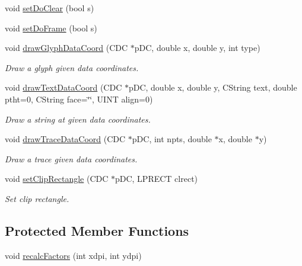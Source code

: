 \begin{DoxyCompactItemize}
\item 
void \hyperlink{classCRPGraphHelper_a94b209990d47ec4314dd090c103d38be}{setDoClear} (bool s)
\item 
void \hyperlink{classCRPGraphHelper_aeb54e6db77199139ccf11a38ad2a1aba}{setDoFrame} (bool s)
\item 
void \hyperlink{classCRPGraphHelper_ab2d2ca19b1e03fc94fb0dc6f3365f8ed}{drawGlyphDataCoord} (CDC $\ast$pDC, double x, double y, int type)
\begin{DoxyCompactList}\small\item\em Draw a glyph given data coordinates. \item\end{DoxyCompactList}\item 
void \hyperlink{classCRPGraphHelper_a787cba80a6c503476034c37aea7672c0}{drawTextDataCoord} (CDC $\ast$pDC, double x, double y, CString text, double ptht=0, CString face=\char`\"{}\char`\"{}, UINT align=0)
\begin{DoxyCompactList}\small\item\em Draw a string at given data coordinates. \item\end{DoxyCompactList}\item 
void \hyperlink{classCRPGraphHelper_abc3f23e555b4e7b04002bec83ac4f089}{drawTraceDataCoord} (CDC $\ast$pDC, int npts, double $\ast$x, double $\ast$y)
\begin{DoxyCompactList}\small\item\em Draw a trace given data coordinates. \item\end{DoxyCompactList}\item 
void \hyperlink{classCRPGraphHelper_aca3dc2bd55c811537a4434321e19fd94}{setClipRectangle} (CDC $\ast$pDC, LPRECT clrect)
\begin{DoxyCompactList}\small\item\em Set clip rectangle. \item\end{DoxyCompactList}\end{DoxyCompactItemize}
\subsection*{Protected Member Functions}
\begin{DoxyCompactItemize}
\item 
void \hyperlink{classCRPGraphHelper_ac4eb0e297f28149498a0894772b8cf57}{recalcFactors} (int xdpi, int ydpi)
\end{DoxyCompactItemize}
